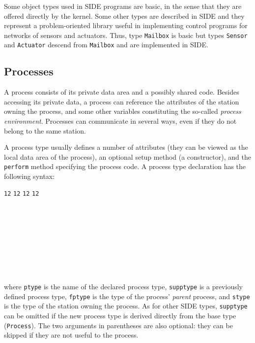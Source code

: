 Some object types used in SIDE programs are basic, in the sense that they
are offered directly by the kernel.
Some other types are described in SIDE and they represent a problem-oriented
library useful in implementing control programs for
networks of sensors and actuators.
Thus, type {\tt Mailbox} is basic but types {\tt Sensor} and {\tt Actuator}
descend from {\tt Mailbox} and are implemented in SIDE.

\subsection{Processes}

A process consists of its private data area and a possibly shared code.
Besides accessing its private data, a process can reference the
attributes of the station owning the process, and some other variables
constituting the so-called {\em process environment}.
Processes can communicate in several ways, even if they do not belong to
the same station.

A process type usually defines a number of attributes (they can be viewed as
the local data area of the process), an optional setup method (a constructor),
and the {\tt perform} method specifying the process code.
A process type declaration has the following syntax:

{\small\begin{tabbing}
{\tt 12} \= {\tt 12} \= {\tt 12} \= {\tt 12} \kill
{}\\
\>\\
\>\\
\>\>\>{\em \ldots}\\
\>\>{\tt \};}\\
\>\\
\>\\
\>\>\>{\em \ldots}\\
\>\>{\tt \};}\\
\>{\tt \};}
\end{tabbing}}

\noindent
where {\tt ptype} is the name of the declared process type,
{\tt supptype} is a previously defined process type,
{\tt fptype} is the type of the process' {\em parent} process, and
{\tt stype} is the type of the station owning the process.
As for other SIDE types, {\tt supptype} can be omitted
if the new process type is derived directly from the base type
({\tt Process}).
The two arguments in parentheses are also optional: they can be skipped
if they are not useful to the process.

